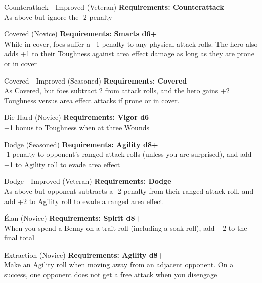 \begin{multicols}{2}
\begin{genericsection}{Counterattack - Improved (Veteran)}
\textbf{Requirements: Counterattack}\\
As above but ignore the -2 penalty
\end{genericsection}

\begin{genericsection}{Covered (Novice)}
\textbf{Requirements: Smarts d6+}\\
While in cover, foes suffer a –1 penalty to any physical attack rolls. The hero also adds +1 to their Toughness against area effect damage as long as they are prone or in cover
\end{genericsection}

\begin{genericsection}{Covered - Improved (Seasoned)}
\textbf{Requirements: Covered}\\
As Covered, but foes subtract 2 from attack rolls, and the hero gains +2 Toughness versus area effect attacks if prone or in cover.
\end{genericsection}

\begin{genericsection}{Die Hard (Novice)}
\textbf{Requirements: Vigor d6+}\\
+1 bonus to Toughness when at three Wounds
\end{genericsection}

\begin{genericsection}{Dodge (Seasoned)}
\textbf{Requirements: Agility d8+}\\
-1 penalty to opponent's ranged attack rolls (unless you are surprised), and add +1 to Agility roll to evade area effect
\end{genericsection}

\begin{genericsection}{Dodge - Improved (Veteran)}
\textbf{Requirements: Dodge}\\
As above but opponent subtracts a -2 penalty from their ranged attack roll, and add +2 to Agility roll to evade a ranged area effect
\end{genericsection}

\begin{genericsection}{Élan (Novice)}
\textbf{Requirements: Spirit d8+}\\
When you spend a Benny on a trait roll (including a soak roll), add +2 to the final total
\end{genericsection}

\begin{genericsection}{Extraction (Novice)}
\textbf{Requirements: Agility d8+}\\
Make an Agility roll when moving away from an adjacent opponent. On a success, one opponent does not get a free attack when you disengage
\end{genericsection}


\end{multicols}
